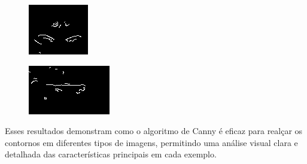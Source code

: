 \begin{figure}[h!]
    \vspace{1cm}

    \begin{minipage}[b]{0.35\textwidth}
        \centering
        \includegraphics[width=0.9\linewidth]{fig/03_nose_edge.png}
        \label{fig:canny-nariz}
    \end{minipage}
    \hspace{0.5cm}
    \begin{minipage}[b]{0.35\textwidth}
        \centering
        \includegraphics[width=0.9\linewidth]{fig/03_mouth_edge.png}
        \label{fig:canny-boca}
    \end{minipage}
    \label{fig:canny-aplicacao}
\end{figure}
Esses resultados demonstram como o algoritmo de Canny é eficaz para realçar os contornos em diferentes tipos de imagens, permitindo uma análise visual clara e detalhada das características principais em cada exemplo.

